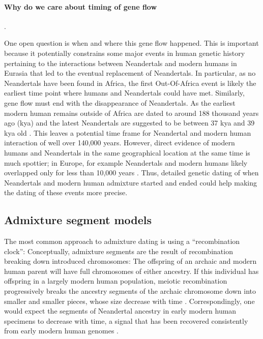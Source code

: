 \documentclass[]{article}
\let\oldparagraph\paragraph
\renewcommand{\paragraph}[1]{\oldparagraph{#1}\mbox{}}
\begin{document}
\paragraph{Why do we care about timing of gene flow}.

One open question is when and where this gene flow happened. This is important because it potentially constrains some major events in human genetic history pertaining to the interactions between Neandertals and modern humans in Eurasia that led to the eventual replacement of Neandertals. In particular, as no Neandertals have been found in Africa, the first Out-Of-Africa event is likely the earliest time point where humans and Neandertals could have met. Similarly, gene flow must end with the disappearance of Neandertals. As the earliest modern human remains outside of Africa are dated to around 188 thousand years ago (kya)  \citep{stringer_when_2018,hershkovitz_earliest_2018} and the latest Neandertals are suggested to be between 37 kya and 39 kya old \citep{zilhao_precise_2017, higham_timing_2014}. This leaves a potential time frame for Neandertal and modern human interaction of well over 140,000 years. However, direct evidence of modern humans and Neandertals in the same geographical location at the same time is much spottier; in Europe, for example Neandertals and modern humans likely overlapped only for less than 10,000 years \citep{bard_extended_2020}. Thus, detailed genetic dating of when Neandertals and modern human admixture started and ended could help making the dating of these events more precise.

\subsection{Admixture segment models}\label{Admixture models}

The most common approach to admixture dating is using a ``recombination clock'': Conceptually, admixture segments are the result of recombination breaking down introduced chromosomes: The offspring of an archaic and modern human parent will have full chromosomes of either ancestry. If this individual has offspring in a largely modern human population, meiotic recombination progressively breaks the ancestry segments of the archaic chromosome  down into smaller and smaller pieces, whose size decrease with time \citep{falush_inference_2003, liang_lengths_2014, gravel_population_2012}. Correspondingly, one would expect the segments of Neandertal ancestry in early modern human specimens to decrease with time, a signal that has been recovered consistently from early modern human genomes \citep{fu_genome_2014, moorjani_genetic_2016, sikora_ancient_2017, sikora_population_2019}. 
\end{document}

